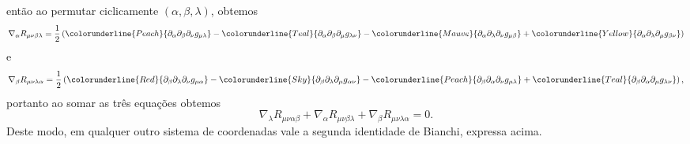 então ao permutar ciclicamente \((\alpha,\beta, \lambda)\), obtemos
\begin{equation*}
    \nabla_{\alpha} R_{\mu\nu \beta\lambda} = \frac12 \left(\colorunderline{Peach}{\partial_{\alpha}\partial_\beta\partial_\nu g_{\mu \lambda}} - \colorunderline{Teal}{\partial_\alpha\partial_\beta\partial_{\mu} g_{\lambda \nu}} - \colorunderline{Mauve}{\partial_\alpha\partial_\lambda\partial_\nu g_{\mu \beta}} + \colorunderline{Yellow}{\partial_\alpha\partial_\lambda\partial_{\mu} g_{\beta \nu}}\right)
\end{equation*}
e
\begin{equation*}
    \nabla_{\beta} R_{\mu\nu \lambda\alpha} = \frac12 \left(\colorunderline{Red}{\partial_{\beta}\partial_\lambda\partial_\nu g_{\mu \alpha}} - \colorunderline{Sky}{\partial_\beta\partial_\lambda\partial_{\mu} g_{\alpha \nu}} - \colorunderline{Peach}{\partial_\beta\partial_\alpha\partial_\nu g_{\mu \lambda}} + \colorunderline{Teal}{\partial_\beta\partial_\alpha\partial_{\mu} g_{\lambda \nu}}\right),
\end{equation*}
portanto ao somar as três equações obtemos
\begin{equation*}
    \nabla_{\lambda} R_{\mu\nu \alpha\beta}+ \nabla_{\alpha} R_{\mu\nu \beta\lambda}+ \nabla_{\beta} R_{\mu\nu \lambda\alpha} = 0.
\end{equation*}
Deste modo, em qualquer outro sistema de coordenadas vale a segunda identidade de Bianchi, expressa acima.

